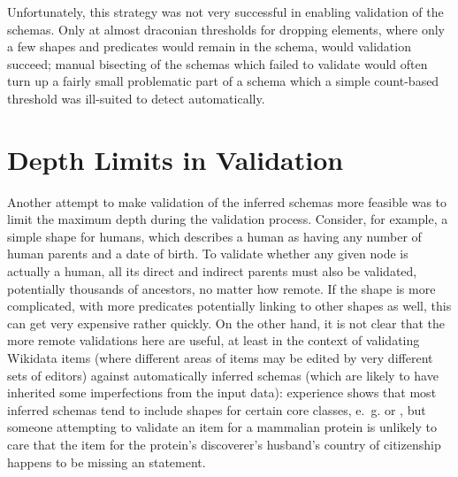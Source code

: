Unfortunately, this strategy was not very successful in enabling validation of the \glspl{schema}.
Only at almost draconian thresholds for dropping elements,
where only a few \glspl{shape} and \glspl{predicate} would remain in the \gls{schema},
would validation succeed;
manual bisecting of the \glspl{schema} which failed to validate
would often turn up a fairly small problematic part of a \gls{schema}
which a simple count-based threshold was ill-suited to detect automatically.

\section{Depth Limits in Validation}
\label{sec:RDF2Graph+Wikidata:depth-limit}

Another attempt to make validation of the inferred \glspl{schema} more feasible
was to limit the maximum depth during the validation process.
Consider, for example, a simple \gls{shape} for humans, %
which describes a human as having any number of human parents and a date of birth.
To validate whether any given node is actually a human,
all its direct and indirect parents must also be validated,
potentially thousands of ancestors, no matter how remote.
If the \gls{shape} is more complicated,
with more predicates potentially linking to other \glspl{shape} as well,
this can get very expensive rather quickly.
On the other hand, it is not clear that the more remote validations here are useful,
at least in the context of validating \gls{Wikidata} \glspl{item}
(where different areas of \glspl{item} may be edited by very different sets of editors)
against automatically inferred \glspl{schema}
(which are likely to have inherited some imperfections from the input data): %
experience shows that %
most inferred \glspl{schema} tend to include \glspl{shape} for certain core classes,
e.~g.  or ,
but someone attempting to validate an \gls{item} for a mammalian protein
is unlikely to care that the \gls{item} for the protein’s discoverer’s husband’s country of citizenship
happens to be missing an  statement.

